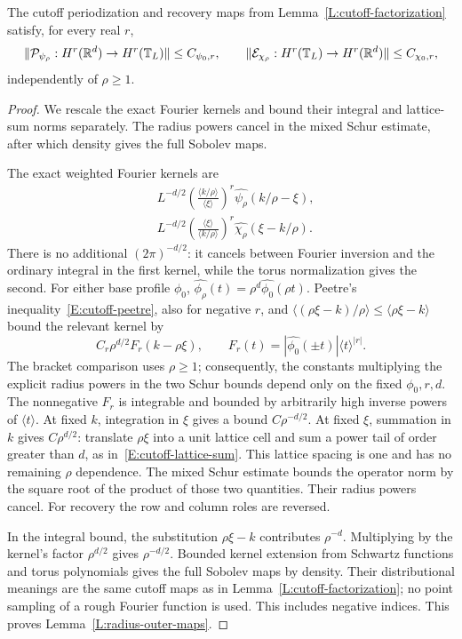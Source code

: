 \begin{lemma}\label{L:radius-outer-maps}
  The cutoff periodization and recovery maps from
  Lemma~\ref{L:cutoff-factorization} satisfy, for every real $r$,
  \[
    \|\mathcal{P}_{\psi_\rho}:H^r(\mathbb{R}^d)\to H^r(\mathbb{T}_L)\|
    \le C_{\psi_0,r},\qquad
    \|\mathcal{E}_{\chi_\rho}:H^r(\mathbb{T}_L)\to H^r(\mathbb{R}^d)\|
    \le C_{\chi_0,r},
  \]
  independently of $\rho \ge 1$.
\end{lemma}

\begin{proof}
  We rescale the exact Fourier kernels and bound their integral and
  lattice-sum norms separately. The radius powers cancel in the mixed Schur
  estimate, after which density gives the full Sobolev maps.

  The exact weighted Fourier kernels are
  \begin{align*}
    &L^{-d/2}
    \left(\frac{\langle k/\rho\rangle}{\langle\xi\rangle}\right)^r
    \widehat{\psi_\rho}(k/\rho-\xi),\\
    &L^{-d/2}
    \left(\frac{\langle\xi\rangle}{\langle k/\rho\rangle}\right)^r
    \widehat{\chi_\rho}(\xi-k/\rho).
  \end{align*}
  There is no additional $(2\pi)^{-d/2}$: it cancels between Fourier inversion
  and the ordinary integral in the first kernel, while the torus normalization
  gives the second. For either base profile $\phi_0$, $\widehat{\phi_\rho}(t) =
  \rho^d\widehat{\phi_0}(\rho t)$. Peetre's inequality~\eqref{E:cutoff-peetre},
  also for negative $r$, and $\langle(\rho\xi-k)/\rho\rangle \le
  \langle\rho\xi-k\rangle$ bound the relevant kernel by
  \[
    C_r\rho^{d/2}F_r(k-\rho\xi),\qquad
    F_r(t)=|\widehat{\phi_0}(\pm t)|\langle t\rangle^{|r|}.
  \]
  The bracket comparison uses $\rho\ge1$; consequently, the constants
  multiplying the explicit radius powers in the two Schur bounds depend only
  on the fixed $\phi_0,r,d$.
  The nonnegative $F_r$ is integrable and bounded by arbitrarily high inverse
  powers of $\langle t\rangle$. At fixed $k$, integration in $\xi$ gives a bound
  $C\rho^{-d/2}$. At fixed $\xi$, summation in $k$ gives $C\rho^{d/2}$:
  translate $\rho\xi$ into a unit lattice cell and sum a power tail of order
  greater than $d$, as in~\eqref{E:cutoff-lattice-sum}. This lattice spacing is
  one and has no remaining $\rho$ dependence. The mixed Schur estimate bounds
  the operator norm by the square root of the product of those two quantities.
  Their radius powers cancel. For recovery the row and column roles are
  reversed.

  In the integral bound, the substitution $\rho\xi-k$ contributes $\rho^{-d}$.
  Multiplying by the kernel's factor $\rho^{d/2}$ gives $\rho^{-d/2}$.
  Bounded kernel extension from Schwartz functions and torus polynomials gives
  the full Sobolev maps by density. Their distributional meanings are the same
  cutoff maps as in Lemma~\ref{L:cutoff-factorization}; no point sampling of a
  rough Fourier function is used. This includes negative indices. This proves
  Lemma~\ref{L:radius-outer-maps}.
\end{proof}

